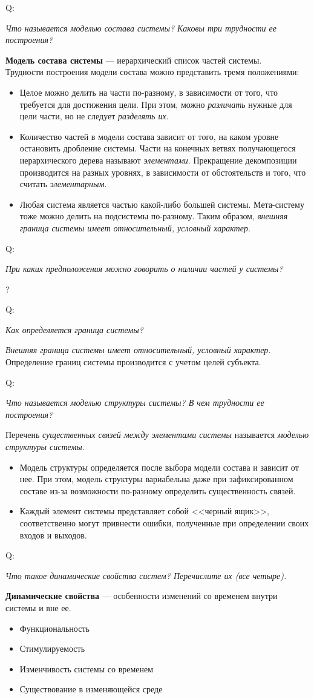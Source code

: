 \documentclass{article}
\newcommand{\note}[1]{\textit{#1}}
\newcommand{\define}[2]{
	\textbf{#1} --- #2
	}
\newcommand{\question}[2]{
	\begin{flushright}
		Q:\hspace{2ex}\vline\hspace{2ex}
		\begin{minipage}{0.9\textwidth}
			\large
			\textit{#1}
		\end{minipage}
	\end{flushright}
	\begin{center}
		\begin{minipage}{0.95\textwidth}
			#2
		\end{minipage}
	\end{center}
	}
\begin{document}
\question{Что называется моделью состава системы? Каковы три трудности ее построения?}{\define{Модель состава системы}{иерархический список частей системы.}\\Трудности построения модели состава можно представить тремя положениями:
	\begin{itemize}
		\item Целое можно делить на части по-разному, в зависимости от того, что требуется для достижения цели. При этом, можно \note{различать} нужные для цели части, но не следует \note{разделять их}.
		\item Количество частей в модели состава зависит от того, на каком уровне остановить дробление системы. Части на конечных ветвях получающегося иерархического дерева называют \note{элементами}. Прекращение декомпозиции производится на разных уровнях, в зависимости от обстоятельств и того, что считать \note{элементарным}.
		\item Любая система является частью какой-либо большей системы. Мета-систему тоже можно делить на подсистемы по-разному. Таким образом, \note{внешняя граница системы имеет относительный, условный характер}.
	\end{itemize}}
\question{При каких предположения можно говорить о наличии частей у системы?}{?}
\question{Как определяется граница системы?}{\note{Внешняя граница системы имеет относительный, условный характер}. Определение границ системы производится с учетом целей субъекта.}
\question{Что называется моделью структуры системы? В чем трудности ее построения?}{Перечень \note{существенных связей между элементами системы} называется \note{моделью структуры системы}.
	\begin{itemize}
		\item Модель структуры определяется после выбора модели состава и зависит от нее. При этом, модель структуры вариабельна даже при зафиксированном составе из-за возможности по-разному определить существенность связей.
		\item Каждый элемент системы представляет собой <<черный ящик>>, соответственно могут привнести ошибки, полученные при определении своих входов и выходов.
	\end{itemize}}	
\question{Что такое динамические свойства систем? Перечислите их (все четыре).}{\define{Динамические свойства}{особенности изменений со временем внутри системы и вне ее.}
	\begin{itemize}
		\item Функциональность
		\item Стимулируемость
		\item Изменчивость системы со временем
		\item Существование в изменяющейся среде
	\end{itemize}}
\end{document}
